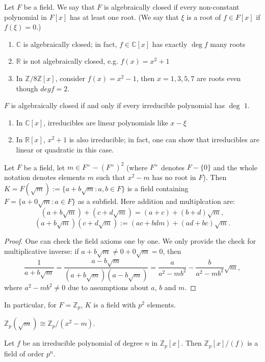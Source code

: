 \documentclass{scrartcl}
\def\Z{\mathbb{Z}}
\def\R{\mathbb{R}}
\def\C{\mathbb{C}}
\begin{document}
\begin{definition}
	Let $F$ be a field. We say that $F$ is algebraically closed if every non-constant polynomial in $F[x]$ has at least one root. (We say that $\xi$ is a root of $f \in F[x]$ if $f(\xi) = 0$.)
\end{definition}
\begin{example}
	\begin{enumerate}
		\item $\C$ is algebraically closed; in fact, $f \in \C[x]$ has exactly $\deg f$ many roots
		\item $\R$ is not algebraically closed, e.g. $f(x)=x^2+1$
		\item In $\Z/8\Z[x]$, consider $f(x)=x^2-1$, then $x=1, 3, 5, 7$ are roots even though $deg f = 2$.
	\end{enumerate}
\end{example}
\begin{lemma}
	$F$ is algebraically closed if and only if every irreducible polynomial has $\deg$ $1$. 
\end{lemma}
\begin{example}
	\begin{enumerate}
		\item In $\C[x]$, irreducibles are linear polynomials like $x-\xi$
		\item In $\R[x]$, $x^2+1$ is also irreducible; in fact, one can show that irreducibles are linear or quadratic in this case. 
	\end{enumerate}
\end{example}
\begin{proposition}
	Let $F$ be a field, let $m \in F^\times - (F^\times)^2$ (where $F^\times$ denotes $F -\{0\}$ and the whole notation denotes elements $m$ such that $x^2-m$ has no root in $F$). Then $K=F(\sqrt{m}):=\{a+b\sqrt{m}: a, b \in F\}$ is a field containing $F = \{a+0\sqrt{m}: a\in F\}$ as a subfield. Here addition and multiplcation are:
	\[(a+b\sqrt{m})+(c+d\sqrt{m}) = (a+c) + (b+d)\sqrt{m},\]
	\[(a+b\sqrt{m})(c+d\sqrt{m}) := (ac+bdm) + (ad+bc)\sqrt{m}.\]
\end{proposition}
\begin{proof}
	One can check the field axioms one by one. We only provide the check for multiplicative inverse: if $a+b\sqrt{m} \ne 0+0\sqrt{m} = 0$, then
	\[\frac{1}{a+b\sqrt{m}} = \frac{a-b\sqrt{m}}{(a+b\sqrt{m})(a-b\sqrt{m})} = \frac{a}{a^2-mb^2}-\frac{b}{a^2-mb^2}\sqrt{m}, \]
	where $a^2-mb^2 \ne 0$ due to assumptions about $a$, $b$ and $m$. 
\end{proof}
\begin{remark}
	In particular, for $F=\Z_p$, $K$ is a field with $p^2$ elements. 
\end{remark}
\begin{remark}
	$\Z_p(\sqrt{m}) \cong \Z_p / (x^2-m)$.
\end{remark}
\begin{theorem}
	Let $f$ be an irreducible polynomial of degree $n$ in $\Z_p[x]$. Then $\Z_p[x]/(f)$ is a field of order $p^n$. 
\end{theorem}
\end{document}
